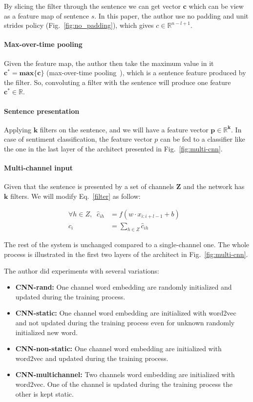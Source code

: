 By slicing the filter through the sentence we can get vector \(\bm{c}\) which can be view as a feature map of sentence \(s\). 
In this paper, the author use no padding and unit strides policy (Fig.~\ref{fig:no_padding}), which gives \(c \in \mathbb{R}^{n-l+1}\).

\paragraph{Max-over-time pooling} Given the feature map, the author then take the maximum value in it \(\bm{c^* = max\{c\}}\) (max-over-time pooling~\cite{nlp-scratch}), which is a sentence feature produced by the filter.
So, convoluting a filter with the sentence will produce one feature \(\bm{c^* \in \mathbb{R}}\).

\paragraph{Sentence presentation} Applying \(\bm{k}\) filters on the sentence, and we will have a feature vector \(\bm{p \in \mathbb{R}^k}\). 
In case of sentiment classification, the feature vector \(p\) can be fed to a classifier like the one in the last layer of the architect presented in Fig.~\ref{fig:multi-cnn}.

\paragraph{Multi-channel input} Given that the sentence is presented by a set of channels \(\bm{Z}\) and the network has \(\bm{k}\) filters. 
We will modify Eq.~\eqref{filter} as follow: 

\begin{align}
	\forall h \in Z, \; \; \hat{c}_{ih} &= f(w \cdot x_{i:i+l-1} + b)& \\
	c_i &= \sum_{h \in Z} \hat{c}_{ih}&
\end{align}

The rest of the system is unchanged compared to a single-channel one.
The whole process is illustrated in the first two layers of the architect in Fig.~\ref{fig:multi-cnn}.

The author did experiments with several variations:

\begin{itemize}
  	\item \textbf{CNN-rand:} One channel word embedding are randomly initialized and updated during the training process.\label{cnn-rand}
	\item \textbf{CNN-static:} One channel word embedding are initialized with word2vec~\cite{word2vec} and not updated during the training process even for unknown randomly initialized new word.\label{cnn-static}
	\item \textbf{CNN-non-static:} One channel word embedding are initialized with word2vec and updated during the training process.\label{cnn-non-static}
	\item \textbf{CNN-multichannel:} Two channels word embedding are initialized with word2vec. One of the channel is updated during the training process the other is kept static.\label{cnn-multichannel}
\end{itemize}

